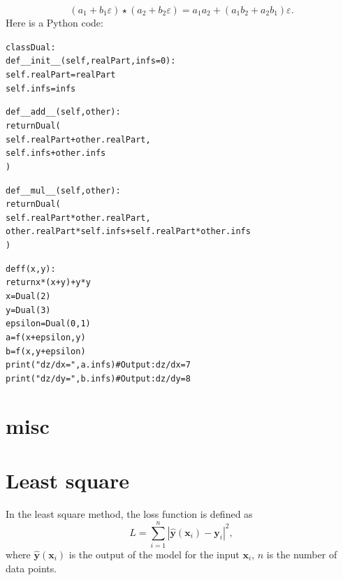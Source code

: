 \documentclass{article}
\newenvironment{tmcode}[1][]{\begin{alltt} }{\end{alltt}}
\begin{document}
\begin{equation}
  (a_1 + b_1 \varepsilon) \star (a_2 + b_2 \varepsilon) = a_1 a_2 + (a_1 b_2 +
  a_2 b_1) \varepsilon .
\end{equation}
Here is a Python code:
\begin{tmcode}
class Dual:
    def __init__(self, realPart, infs=0):
        self.realPart = realPart
        self.infs = infs

    def __add__(self, other):
        return Dual(
            self.realPart + other.realPart,
            self.infs + other.infs
        )

    def __mul__(self, other):
        return Dual(
            self.realPart * other.realPart,
            other.realPart * self.infs + self.realPart * other.infs
        )

def f(x, y):
    return x * (x + y) + y * y
x = Dual(2)
y = Dual(3)
epsilon = Dual(0, 1)
a = f(x + epsilon, y)
b = f(x, y + epsilon)
print("dz/dx =", a.infs)  # Output: dz/dx= 7
print("dz/dy =", b.infs)  # Output: dz/dy = 8
\end{tmcode}


\section{misc}

\section{Least square}

In the least square method, the loss function is defined as
\begin{equation}
  L = \sum_{i = 1}^n | \hat{\mathbf{y}} (\mathbf{x}_i) -\mathbf{y}_i |^2,
\end{equation}
where $\hat{\mathbf{y}} (\mathbf{x}_i)$ is the output of the model for the
input $\mathbf{x}_i$, $n$ is the number of data points.
\end{document}
